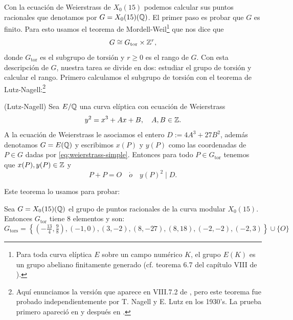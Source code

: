 \documentclass[../../tesis_maestria]{subfiles}
\begin{document}
Con la ecuación de Weierstrass de $X_0(15)$ podemos calcular sus puntos racionales que denotamos por $G=X_0(15)(\mathbb{Q})$. El primer paso es probar que $G$ es finito. Para esto usamos el teorema de Mordell-Weil\footnote{Para toda curva elíptica $E$ sobre un campo numérico $K$, el grupo $E(K)$ es un grupo abeliano finitamente generado (cf. teorema 6.7 del capítulo VIII de \cite{SilvermanTAOEC}).} que nos dice que
\[
	G\cong G_{\mathrm{tor}}\times\mathbb{Z}^r,
\]
donde $G_{\mathrm{tor}}$ es el subgrupo de torsión y $r\geq0$ es el rango de $G$. Con esta descripción de $G$, nuestra tarea se divide en dos: estudiar el grupo de torsión y calcular el rango. Primero calculamos el subgrupo de torsión con el teorema de Lutz-Nagell:\footnote{Aquí enunciamos la versión que aparece en VIII.7.2 de \cite{SilvermanTAOEC}, pero este teorema fue probado independientemente por T. Nagell y E. Lutz en los 1930's. La prueba primero apareció en \cite{Nagell} y después en \cite{Lutz}.}

\begin{thm}(Lutz-Nagell)\label{thm:Lutz-Nagelll}
	Sea $E/\mathbb{Q}$ una curva elíptica con ecuación de Weierstrass
	\begin{equation}\label{eq:weierstrass-simple}
		y^2=x^3+Ax+B,\quad A,B\in\mathbb{Z}.
	\end{equation}
A la ecuación de Weierstrass le asociamos el entero $D:=4A^3+27B^2$, además denotamos $G=E(\mathbb{Q})$ y escribimos $x(P)$ y $y(P)$ como las coordenadas de $P\in G$ dadas por \eqref{eq:weierstrass-simple}. Entonces para todo $P\in G_{\mathrm{tor}}$ tenemos que $x(P),y(P)\in\mathbb{Z}$ y
\[
	P+P=O\quad\acute{o}\quad y(P)^2\mid D.
\]
\end{thm}

Este teorema lo usamos para probar:

\begin{prop}\label{prop:grupo-torsion-x15}
	Sea $G=X_0(15)(\mathbb{Q})$ el grupo de puntos racionales de la curva modular $X_0(15)$. Entonces $G_\mathrm{tor}$ tiene 8 elementos y son:
	\[
		G_\mathrm{tors}=
		\left\{ \left(-\tfrac{13}{4},\tfrac{9}{8}\right),(-1,0),(3,-2),(8,-27),(8,18),(-2,-2),(-2,3) \right\}\cup\{O\}
	\]
\end{prop}
\end{document}
